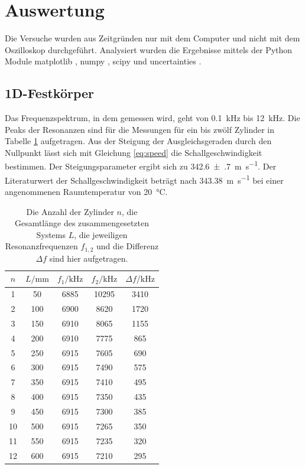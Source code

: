 \newpage
\section{Auswertung}
\label{sec:Auswertung}

Die Versuche wurden aus Zeitgründen nur mit dem Computer und nicht mit dem Oszilloskop durchgeführt. Analysiert wurden die Ergebnisse mittels der Python Module matplotlib \cite{matplotlib}, numpy \cite{numpy}, scipy \cite{scipy} und uncertainties \cite{uncertainties}.

\subsection{1D-Festkörper}

Das Frequenzspektrum, in dem gemessen wird, geht von \SI{0.1}{\kilo\hertz} bis \SI{12}{\kilo\hertz}. 
Die Peaks der Resonanzen sind für die Messungen für ein bis zwölf Zylinder in Tabelle \ref{tab:rohr} aufgetragen. Aus der Steigung der Ausgleichsgeraden durch den Nullpunkt lässt sich mit Gleichung \ref{eq:speed} die Schallgeschwindigkeit bestimmen. Der Steigungsparameter ergibt sich zu \SI{342.6(7)}{\meter\per\second}. 
Der Literaturwert der Schallgeschwindigkeit beträgt nach \cite{speed} \SI{343.38}{\metre\per\second} bei einer angenommenen Raumtemperatur von \SI{20}{\celsius}. 

\begin{table}\caption{Die Anzahl der Zylinder $n$, die Gesamtlänge des zusammengesetzten Systems $L$, die jeweiligen Resonanzfrequenzen $f_{1,2}$ und die Differenz $\Delta f$ sind hier aufgetragen.}
    \label{tab:rohr}
    \centering
     \begin{tabular}{c c | c c | c} 
    \toprule
{$n$} & {$L / \si{\milli\metre}$} & {$f_1 / \si{\kilo\hertz}$} & {$f_2 / \si{\kilo\hertz}$} & {$\Delta f / \si{\kilo\hertz}$} \\
\midrule
1     &    50   &  6885  &  10295 &   3410  \\
2     &   100   &  6900  &  8620  &   1720  \\
3     &   150   &  6910  &  8065  &   1155  \\ 
4     &   200   &  6910  &  7775  &   865  \\
5     &   250   &  6915  &  7605  &   690  \\
6     &   300   &  6915  &  7490  &   575  \\  
7     &   350   &  6915  &  7410  &   495  \\  
8     &   400   &  6915  &  7350  &   435  \\  
9     &   450   &  6915  &  7300  &   385  \\  
10    &   500   &  6915  &  7265  &   350  \\    
11    &   550   &  6915  &  7235  &   320  \\  
12    &   600   &  6915  &  7210  &   295  \\

\bottomrule
\end{tabular}\end{table}

